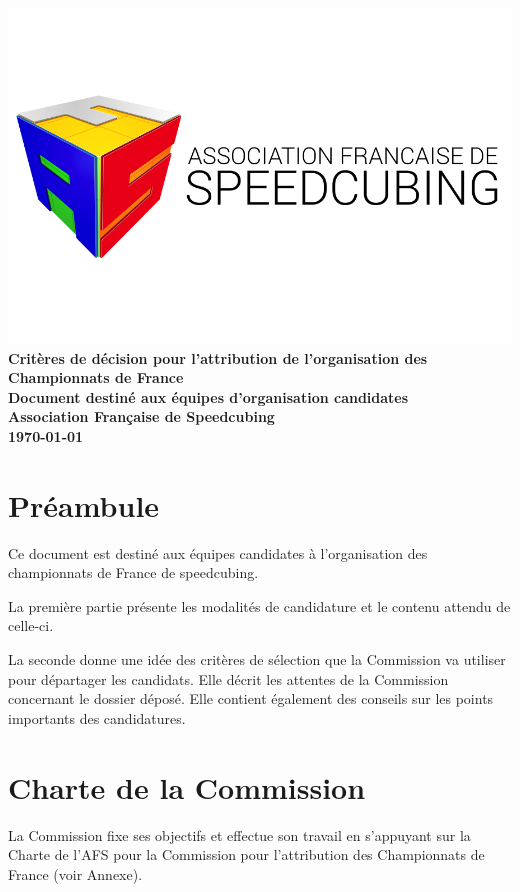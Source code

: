 \documentclass[a4paper,12pt]{scrartcl}
\begin{document}
\sloppy

\begin{titlepage}
    \centering
    \vfill
    \includegraphics[width=\textwidth]{logoafsletters.png}
    \vfill
    {\bfseries\Huge
        Critères de décision pour l'attribution de l'organisation des Championnats de France\\
		\vskip1cm
	\large
        Document destiné aux équipes d'organisation candidates\\
        \vskip3cm
        Association Française de Speedcubing\\
        \vskip2cm
\today
    }    
    \vfill
\end{titlepage}


\pagebreak


\section*{Préambule}

Ce document est destiné aux équipes candidates à l'organisation des championnats de France
de speedcubing.

La première partie présente les modalités de candidature et le contenu attendu de celle-ci.

La seconde donne une idée des critères de sélection que la Commission va utiliser
pour départager les candidats. Elle décrit les attentes de la Commission concernant
le dossier déposé. Elle contient également des conseils sur les points importants des candidatures.


\section*{Charte de la Commission}
La Commission fixe ses objectifs et effectue son travail en s'appuyant sur la Charte de l'AFS pour la Commission pour l'attribution des Championnats de France (voir Annexe).
 
\end{document}
